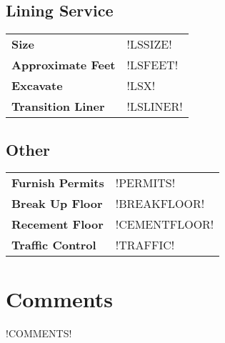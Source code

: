 \documentclass{article}
\begin{document}
\subsection*{Lining Service}
\begin{tabularx}{\textwidth}{p{100px} X}
    \textbf{Size} & !LSSIZE! \\
    \textbf{Approximate Feet} & !LSFEET! \\
    \textbf{Excavate} & !LSX! \\
    \textbf{Transition Liner} & !LSLINER! \\
\end{tabularx}

\subsection*{Other}
\begin{tabularx}{\textwidth}{p{100px} X}
    \textbf{Furnish Permits} & !PERMITS! \\
    \textbf{Break Up Floor} & !BREAKFLOOR! \\
    \textbf{Recement Floor} & !CEMENTFLOOR! \\
    \textbf{Traffic Control} & !TRAFFIC! \\
\end{tabularx}

\section*{Comments}
!COMMENTS!
\end{document}
